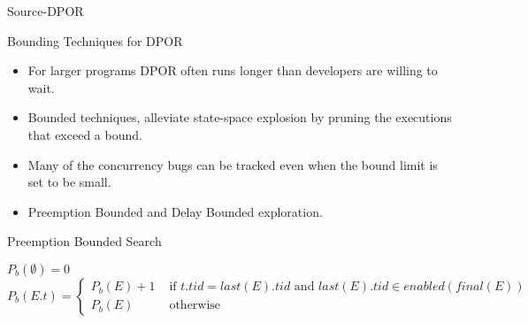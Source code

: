 \documentclass[9pt]{beamer}
\begin{document}
\begin{frame}{Source-DPOR}

\begin{figure}
    
\end{figure}

\end{frame}
\begin{frame}{Bounding Techniques for DPOR}

\begin{itemize}[<+->]
\item For larger programs DPOR often runs longer than developers are willing to wait. 
\item Bounded techniques, alleviate state-space explosion by pruning the executions
that exceed a bound. 
\item Many of the concurrency bugs can be tracked even when the bound limit is set to be small.
\item Preemption Bounded and Delay Bounded exploration.
\end{itemize}
    
\end{frame}



\begin{frame}{Preemption Bounded Search}

\begin{definition}
$P_b(\emptyset) = 0$ \\
$P_b(E.t) = 
 \begin{cases} 
    P_b(E) + 1 & \text{ if } t.tid = last(E).tid \text{ and } last(E).tid \in enabled(final(E)) \\
    P_b(E) & \text{ otherwise }
 \end{cases}
$
\end{definition}
    
\end{frame}
\end{document}
